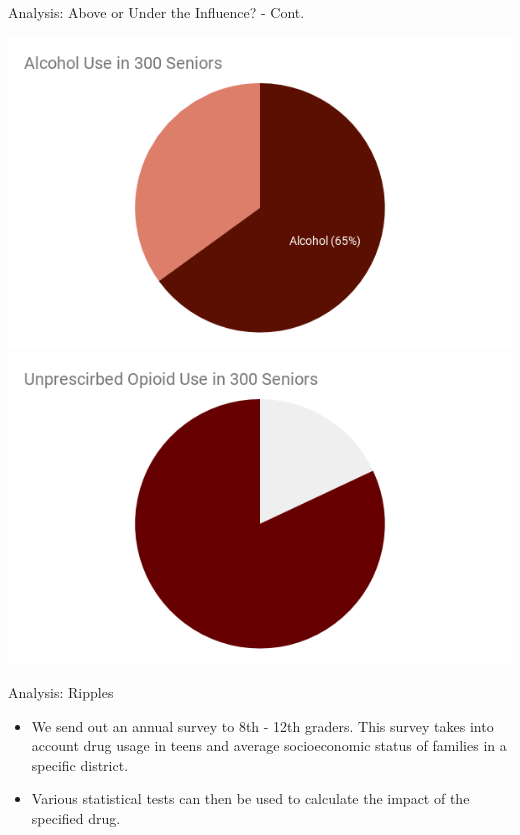 \documentclass{beamer}
\begin{document}
\begin{frame}{Analysis: Above or Under the Influence? - Cont.}
\begin{center}
        \includegraphics[scale=.25]{images/aboveunder-alcohol.png}
        \includegraphics[scale=.25]{images/aboveunder-opioids.png}
    \end{center}
\end{frame}

\begin{frame}{Analysis: Ripples}
    \begin{itemize}
        \item We send out an annual survey to 8th - 12th graders. This survey takes into account drug usage in teens and average socioeconomic status of families in a specific district. 
        \item Various statistical tests can then be used to calculate the impact of the specified drug. 
    \end{itemize}
\end{frame}
\end{document}
